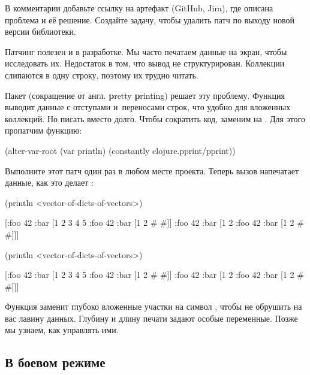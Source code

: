 \fi

В комментарии добавьте ссылку на артефакт (GitHub, Jira), где описана проблема и
её решение. Создайте задачу, чтобы удалить патч по выходу новой версии
библиотеки.

Патчинг полезен и в разработке. Мы часто печатаем данные на экран, чтобы
исследовать их. Недостаток  в том, что вывод не
структурирован. Коллекции слипаются в одну строку, поэтому их трудно читать.


Пакет  (сокращение от англ. \textbf{p}retty \textbf{p}rinting)
решает эту проблему. Функция  выводит данные с отступами и~переносами строк,
что удобно для вложенных коллекций. Но писать 
вместо  долго. Чтобы сократить код, заменим 
на . Для этого пропатчим функцию:

\begin{clojure}
(alter-var-root
 (var println)
 (constantly clojure.pprint/pprint))
\end{clojure}

Выполните этот патч один раз в любом месте проекта. Теперь вызов
 напечатает данные, как это делает :

\ifnarrow

\begin{clojure}
(println <vector-of-dicts-of-vectors>)

[{:foo 42
  :bar [1 2 3 4 5 {:foo 42
                   :bar [1 2 {# #}]}]}
 {:foo 42
  :bar [1 2 {:foo 42
             :bar [1 2 {# #}]}]}]
\end{clojure}

\else

\begin{clojure}
(println <vector-of-dicts-of-vectors>)

[{:foo 42
  :bar [1 2 3 4 5 {:foo 42
                   :bar [1 2 {# #}]}]}
 {:foo 42
  :bar [1 2 {:foo 42
             :bar [1 2 {# #}]}]}]
\end{clojure}

\fi

Функция заменит глубоко вложенные участки на символ \code{\#}, чтобы не обрушить
на вас лавину данных. Глубину и длину печати задают особые переменные. Позже мы
узнаем, как управлять ими.

\subsection{В боевом режиме}

